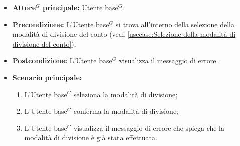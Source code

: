 \label{usecase:Visualizzazione errore divisione del conto già effettuata}
\begin{itemize}
	\item \textbf{\gls{Attore}$^G$ principale:} \gls{Utente base}$^G$.

	\item \textbf{Precondizione:}
	      L'\gls{Utente base}$^G$ si trova all'interno della selezione della modalità di divisione del conto (vedi \autoref{usecase:Selezione della modalità di divisione del conto}).

	\item \textbf{Postcondizione:}
	      L'\gls{Utente base}$^G$ visualizza il messaggio di errore.

	\item \textbf{Scenario principale:}
	      \begin{enumerate}
		      \item L'\gls{Utente base}$^G$ seleziona la modalità di divisione;

		      \item L'\gls{Utente base}$^G$ conferma la modalità di divisione;

		      \item L'\gls{Utente base}$^G$ visualizza il messaggio di errore che spiega che
		            la modalità di divisione è già stata effettuata.
	      \end{enumerate}
\end{itemize}
